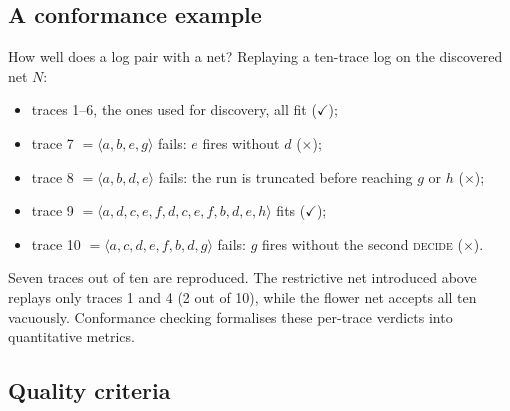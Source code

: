 \subsection{A conformance example}

How well does a log pair with a net? Replaying a ten-trace log on the discovered net $N$:
\begin{itemize}
  \item traces 1--6, the ones used for discovery, all fit ($\checkmark$);
  \item trace 7 $= \langle a, b, e, g\rangle$ fails: $e$ fires without $d$ ($\times$);
  \item trace 8 $= \langle a, b, d, e\rangle$ fails: the run is truncated before reaching $g$ or $h$ ($\times$);
  \item trace 9 $= \langle a, d, c, e, f, d, c, e, f, b, d, e, h\rangle$ fits ($\checkmark$);
  \item trace 10 $= \langle a, c, d, e, f, b, d, g\rangle$ fails: $g$ fires without the second \textsc{decide} ($\times$).
\end{itemize}
Seven traces out of ten are reproduced. The restrictive net introduced above replays only traces 1 and 4 (2 out of 10), while the flower net accepts all ten vacuously. Conformance checking formalises these per-trace verdicts into quantitative metrics.

\subsection{Quality criteria}

